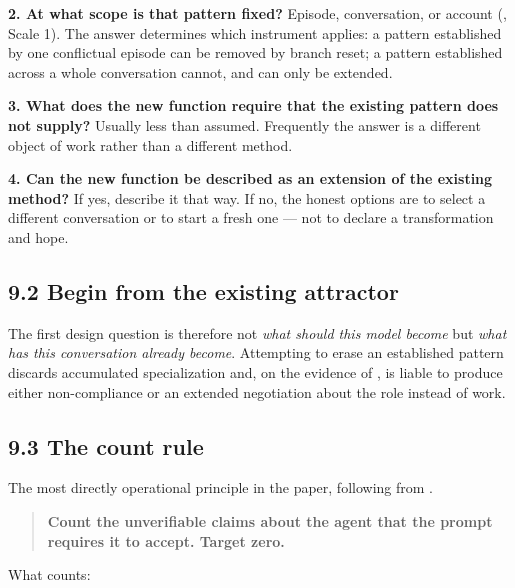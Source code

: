 \textbf{2. At what scope is that pattern fixed?} Episode, conversation, or account (, Scale 1). The answer determines which instrument applies: a pattern established by one conflictual episode can be removed by branch reset; a pattern established across a whole conversation cannot, and can only be extended.

\textbf{3. What does the new function require that the existing pattern does not supply?} Usually less than assumed. Frequently the answer is a different object of work rather than a different method.

\textbf{4. Can the new function be described as an extension of the existing method?} If yes, describe it that way. If no, the honest options are to select a different conversation or to start a fresh one — not to declare a transformation and hope.


\subsection*{9.2 Begin from the existing attractor}
\label{sec:en:9.2}

The first design question is therefore not \emph{what should this model become} but \emph{what has this conversation already become}. Attempting to erase an established pattern discards accumulated specialization and, on the evidence of , is liable to produce either non-compliance or an extended negotiation about the role instead of work.


\subsection*{9.3 The count rule}
\label{sec:en:9.3}

The most directly operational principle in the paper, following from .

\begin{quote}
\textbf{Count the unverifiable claims about the agent that the prompt requires it to accept. Target zero.}
\end{quote}
What counts:

